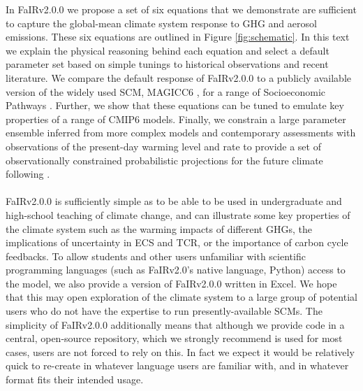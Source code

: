 \documentclass[gmd, manuscript]{copernicus}
\begin{document}
%
In FaIRv2.0.0 we propose a set of six equations that we demonstrate are sufficient to capture the global-mean climate system response to GHG and aerosol emissions. These six equations are outlined in Figure \ref{fig:schematic}. In this text we explain the physical reasoning behind each equation and select a default parameter set based on simple tunings to historical observations and recent literature. We compare the default response of FaIRv2.0.0 to a publicly available version of the widely used SCM, MAGICC6 \citep{Meinshausen2011,Meinshausen2011b}, for a range of Socioeconomic Pathways \citep[SSPs]{Riahi2017}. Further, we show that these equations can be tuned to emulate key properties of a range of CMIP6 \citep{Eyring2016} models. Finally, we constrain a large parameter ensemble inferred from more complex models and contemporary assessments with observations of the present-day warming level and rate to provide a set of observationally constrained probabilistic projections for the future climate following \citep{Smith2018}.\\\\
%
FaIRv2.0.0 is sufficiently simple as to be able to be used in undergraduate and high-school teaching of climate change, and can illustrate some key properties of the climate system such as the warming impacts of different GHGs, the implications of uncertainty in ECS and TCR, or the importance of carbon cycle feedbacks. To allow students and other users unfamiliar with scientific programming languages (such as FaIRv2.0's native language, Python) access to the model, we also provide a version of FaIRv2.0.0 written in Excel. We hope that this may open exploration of the climate system to a large group of potential users who do not have the expertise to run presently-available SCMs. The simplicity of FaIRv2.0.0 additionally means that although we provide code in a central, open-source repository, which we strongly recommend is used for most cases, users are not forced to rely on this. In fact we expect it would be relatively quick to re-create in whatever language users are familiar with, and in whatever format fits their intended usage.\\\\
%
\end{document}
